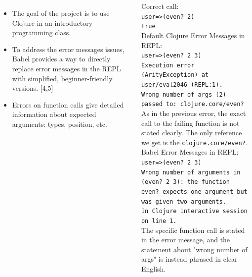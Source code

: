 \documentclass[17pt, a0paper, landscape,  margin=0mm, innermargin=10mm, blockverticalspace=3mm, colspace=3mm, subcolspace=3mm]{tikzposter}
\begin{document}
\begin{columns}
{    \begin{itemize}
        \item The goal of the project is to use Clojure in an introductory programming class. 
        \item To address the error messages issues, Babel provides a way to directly replace error messages in the REPL with simplified, beginner-friendly versions. [4,5]
        \item Errors on function calls give detailed information about expected arguments: types, position, etc.
    \end{itemize}
        Correct call: \\
    \texttt{user=>(even? 2)} \\
    \texttt{true} \\
    Default Clojure Error Messages in REPL: \\
    \texttt{user=>(even? 2 3)} \\
    \texttt{Execution error (ArityException) at user/eval2046 (REPL:1).} \\ 
     \texttt{Wrong number of args (2) passed to: clojure.core/even?} \\
As in the previous error, the exact call to the failing function is not stated clearly. The only reference we get is the \texttt{clojure.core/even?}. \\

    Babel Error Messages in REPL: \\
    \texttt{user=>(even? 2 3)} \\
    \texttt{Wrong number of arguments in (even? 2 3): the function even? expects one argument but was given two arguments.} \\
    \texttt{In Clojure interactive session on line 1.} \\
The specific function call is stated in the error message, and the statement about "wrong number of args" is instead phrased in clear English. 

\vspace*{0.145in}
}




\end{columns}
\end{document}
